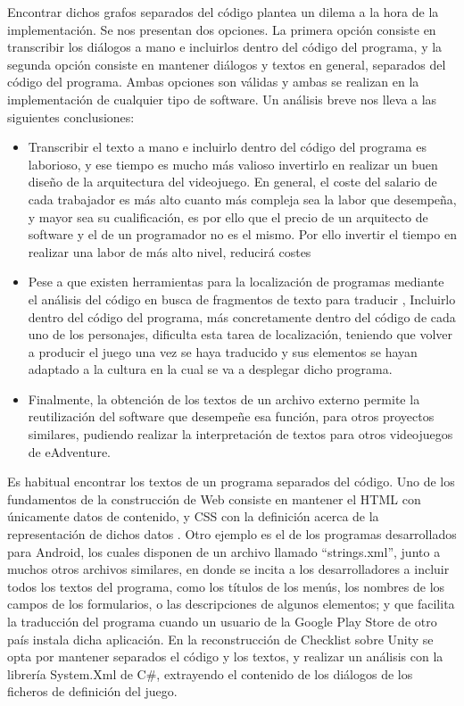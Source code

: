 Encontrar dichos grafos separados del código plantea un dilema a la hora de la implementación. Se nos presentan dos opciones. La primera opción consiste en transcribir los diálogos a mano e incluirlos dentro del código del programa, y la segunda opción consiste en mantener diálogos y textos en general, separados del código del programa. Ambas opciones son válidas y ambas se realizan en la implementación de cualquier tipo de software. Un análisis breve nos lleva a las siguientes conclusiones: 

\begin{itemize}
	\item 
	Transcribir el texto a mano e incluirlo dentro del código del programa es laborioso, y ese tiempo es mucho más valioso invertirlo en realizar un buen diseño de la arquitectura del videojuego. En general, el coste del salario de cada trabajador es más alto cuanto más compleja sea la labor que desempeña, y mayor sea su cualificación, es por ello que el precio de un arquitecto de software y el de un programador no es el mismo. Por ello invertir el tiempo en realizar una labor de más alto nivel, reducirá costes
	\item 
	Pese a que existen herramientas para la localización de programas mediante el análisis del código en busca de fragmentos de texto para traducir \cite{TorresMolina2007}, Incluirlo dentro del código del programa, más concretamente dentro del código de cada uno de los personajes, dificulta esta tarea de localización, teniendo que volver a producir el juego una vez se haya traducido y sus elementos se hayan adaptado a la cultura en la cual se va a desplegar dicho programa. 
	\item
	Finalmente, la obtención de los textos de un archivo externo permite la reutilización del software que desempeñe esa función, para otros proyectos similares, pudiendo realizar la interpretación de textos para otros videojuegos de eAdventure. 
\end{itemize}

Es habitual encontrar los textos de un programa separados del código. Uno de los fundamentos de la construcción de Web consiste en mantener el HTML con únicamente datos de contenido, y CSS con la definición acerca de la representación de dichos datos \cite{cssseparar}. Otro ejemplo es el de los programas desarrollados para Android, los cuales disponen de un archivo llamado “strings.xml”, junto a muchos otros archivos similares, en donde se incita a los desarrolladores a incluir todos los textos del programa, como los títulos de los menús, los nombres de los campos de los formularios, o las descripciones de algunos elementos\cite{Reina2012}; y que facilita la traducción del programa cuando un usuario de la Google Play Store de otro país instala dicha aplicación. En la reconstrucción de Checklist sobre Unity se opta por mantener separados el código y los textos, y realizar un análisis con la librería System.Xml de C\#, extrayendo el contenido de los diálogos de los ficheros de definición del juego. 

